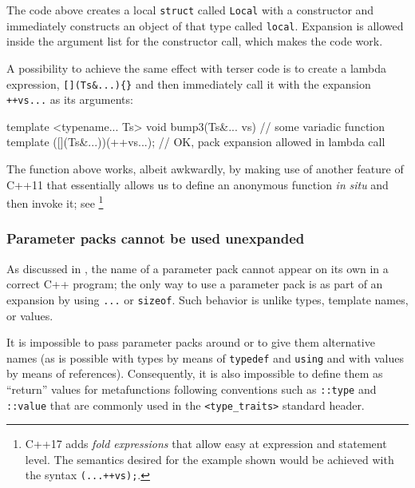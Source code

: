 \noindent The code above creates a local \lstinline!struct! called \lstinline!Local!
with a constructor and immediately constructs an object of that type
called \lstinline!local!. Expansion is allowed inside the argument list for
the constructor call, which makes the code work.

A possibility to achieve the same effect with terser code is to create a
lambda expression, \lstinline![](Ts&...){}! and then immediately call it
with the expansion \lstinline!++vs...! as its arguments:

\begin{emcppslisting}
template <typename... Ts>
void bump3(Ts&... vs)          // some variadic function template
{
     ([](Ts&...){})(++vs...);  // OK, pack expansion allowed in lambda call
}
\end{emcppslisting}
    

\noindent The function above works, albeit awkwardly, by making use of another
feature of C++11 that essentially allows us to define an anonymous
function \emph{in} \emph{situ} and then invoke it; see
{\cprotect\footnote{C++17 adds \emph{fold expressions} that allow easy 
  at expression and statement level. The semantics desired for the
  example shown would be achieved with the syntax \lstinline!(...++vs);!.}}

\subsubsection[Parameter packs cannot be used unexpanded]{Parameter packs cannot be used unexpanded}\label{parameter-packs-cannot-be-used-unexpanded}

As discussed in , the name of a
parameter pack cannot appear on its own in a correct C++ program; the
only way to use a parameter pack is as part of an expansion by using
\lstinline!...! or \lstinline!sizeof!. Such behavior is unlike types, template
names, or values.

It is impossible to pass parameter packs around or to give them
alternative names (as is possible with types by means of
\lstinline!typedef! and \lstinline!using! and with values by means of
references). Consequently, it is also impossible to define them as
``return'' values for metafunctions following conventions such as
\lstinline!::type! and \lstinline!::value! that are commonly used in the
\lstinline!<type_traits>! standard header.

